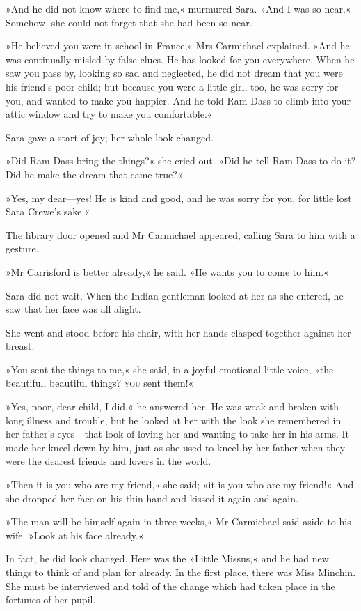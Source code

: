 »And he did not know where to find me,« murmured Sara. »And I was so near.« Somehow, she could not forget that she had been so near.

»He believed you were in school in France,« Mrs Carmichael explained. »And he was continually misled by false clues. He has looked for you everywhere. When he saw you pass by, looking so sad and neglected, he did not dream that you were his friend's poor child; but because you were a little girl, too, he was sorry for you, and wanted to make you happier. And he told Ram Dass to climb into your attic window and try to make you comfortable.«

Sara gave a start of joy; her whole look changed.

»Did Ram Dass bring the things?« she cried out. »Did he tell Ram Dass to do it? Did he make the dream that came true?«

»Yes, my dear—yes! He is kind and good, and he was sorry for you, for little lost Sara Crewe's sake.«

The library door opened and Mr Carmichael appeared, calling Sara to him with a gesture.

»Mr Carrisford is better already,« he said. »He wants you to come to him.«

Sara did not wait. When the Indian gentleman looked at her as she entered, he saw that her face was all alight.

She went and stood before his chair, with her hands clasped together against her breast.

»You sent the things to me,« she said, in a joyful emotional little voice, »the beautiful, beautiful things? \textsc{you} sent them!«

»Yes, poor, dear child, I did,« he answered her. He was weak and broken with long illness and trouble, but he looked at her with the look she remembered in her father's eyes—that look of loving her and wanting to take her in his arms. It made her kneel down by him, just as she used to kneel by her father when they were the dearest friends and lovers in the world.

»Then it is you who are my friend,« she said; »it is you who are my friend!« And she dropped her face on his thin hand and kissed it again and again.

»The man will be himself again in three weeks,« Mr Carmichael said aside to his wife. »Look at his face already.«

In fact, he did look changed. Here was the »Little Missus,« and he had new things to think of and plan for already. In the first place, there was Miss Minchin. She must be interviewed and told of the change which had taken place in the fortunes of her pupil.

